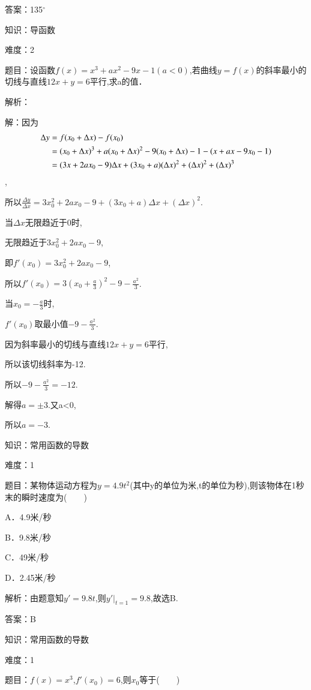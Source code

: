 \documentclass{article} %
\begin{document}
答案：135${{}^\circ}$



知识：导函数

难度：2

题目：设函数$f(x)=x^{3}+ax^{2}-9x-1(a<0)$,若曲线$y=f(x)$的斜率最小的切线与直线$12x+y=6$平行,求a的值．

解析：

解：因为
\begin{align}
\notag
\Delta y&=f(x_{0}+\Delta x)-f(x_{0})\\\notag
&=(x_{0}+\Delta x)^{3}+a(x_{0}+\Delta x)^{2}-9(x_{0}+\Delta x)-1-(x+ax-9x_{0}-1)\\\notag
&=(3x+2ax_{0}-9)\Delta x+(3x_{0}+a)(\Delta x)^{2}+(\Delta x)^{2}+(\Delta x)^{3}
\end{align}
,

所以$\frac{\Delta y}{\Delta x}=3x_0^2+2ax_{0}-9+(3x_{0}+a)\Delta x+(\Delta x)^{2}$.

当$\Delta x$无限趋近于0时,

无限趋近于$3x_0^2+2ax_{0}-9$,

即$f'(x_{0})=3x_0^2+2ax_{0}-9$,

所以$f'(x_{0})=3(x_{0}+\frac{a}{3})^{2}-9-\frac{a^2}{3}$.

当$x_{0}=-\frac{a}{3}$时,

$f'(x_{0})$取最小值$-9-\frac{a^2}{3}$.

因为斜率最小的切线与直线$12x+y=6$平行,

所以该切线斜率为-12.

所以$-9-\frac{a^2}{3}=-12$.

解得$a=\pm 3$.又a<0,

所以$a=-3$.



知识：常用函数的导数

难度：1

题目：某物体运动方程为$y=4.9t^{2}$(其中y的单位为米,t的单位为秒),则该物体在1秒末的瞬时速度为(　　)

A．4.9米/秒　　　 

B．9.8米/秒

C．49米/秒   

D．2.45米/秒

解析：由题意知$y'=9.8t$,则$y'|_{t=1}=9.8$,故选B.

答案：B



知识：常用函数的导数

难度：1

题目：$f(x)=x^{3}$,$f'(x_{0})=6$,则$x_{0}$等于(　　)
\end{document}
